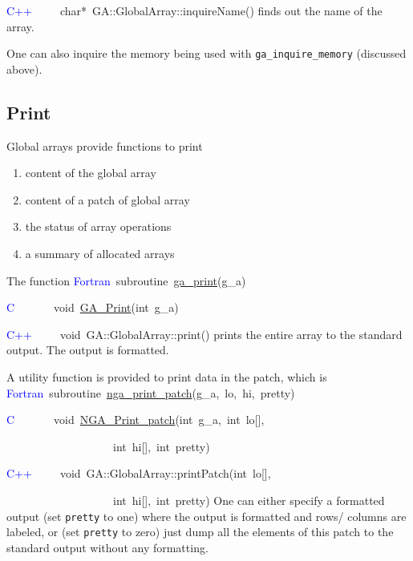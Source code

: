 \textcolor{blue}{C++}~~~~~char{*}~GA::GlobalArray::inquireName()
finds out the name of the array.

One can also inquire the memory being used with \texttt{ga\_inquire\_memory}
(discussed above). 


\subsection{Print }

Global arrays provide functions to print
\begin{enumerate}
\item content of the global array 
\item content of a patch of global array 
\item the status of array operations 
\item a summary of allocated arrays
\end{enumerate}
The function
\textcolor{blue}{Fortran}~subroutine~\href{http://www.emsl.pnl.gov/docs/global/ga_ops.html\#ga_print}{ga\_{}print}(g\_a)~

\textcolor{blue}{C}~~~~~~~void~\href{http://www.emsl.pnl.gov/docs/global/c_nga_ops.html\#ga_print}{GA\_{}Print}(int~g\_a)~

\textcolor{blue}{C++}~~~~~void~GA::GlobalArray::print()
prints the entire array to the standard output. The output is formatted.

A utility function is provided to print data in the patch, which is
\textcolor{blue}{Fortran}~subroutine~\href{http://www.emsl.pnl.gov/docs/global/ga_ops.html\#ga_print_patch}{nga\_{}print\_{}patch}(g\_a,~lo,~hi,~pretty)~

\textcolor{blue}{C}~~~~~~~void~\href{http://www.emsl.pnl.gov/docs/global/c_nga_ops.html\#ga_print_patch}{NGA\_{}Print\_{}patch}(int~g\_a,~int~lo{[}{]},~

~~~~~~~~~~~~~~~~~~~int~hi{[}{]},~int~pretty)~

\textcolor{blue}{C++}~~~~~void~GA::GlobalArray::printPatch(int~lo{[}{]},~

~~~~~~~~~~~~~~~~~~~int~hi{[}{]},~int~pretty)
One can either specify a formatted output (set \texttt{pretty} to
one) where the output is formatted and rows/ columns are labeled,
or (set \texttt{pretty} to zero) just dump all the elements of this
patch to the standard output without any formatting.

